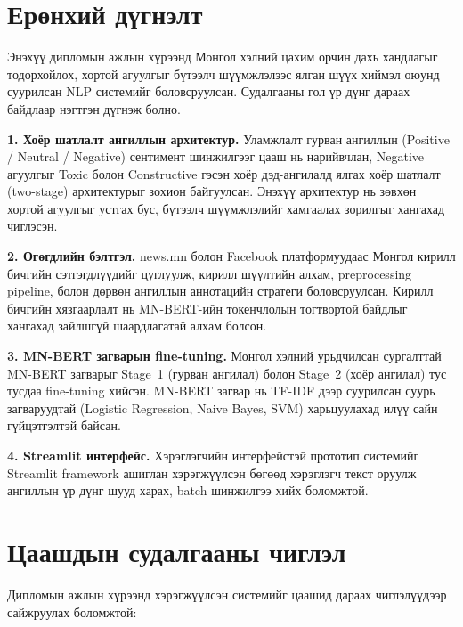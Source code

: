 
{}
\label{Summary}

\section*{Ерөнхий дүгнэлт}

Энэхүү дипломын ажлын хүрээнд Монгол хэлний цахим орчин дахь хандлагыг
тодорхойлох, хортой агуулгыг бүтээлч шүүмжлэлээс ялган шүүх хиймэл оюунд
суурилсан NLP системийг боловсруулсан. Судалгааны гол үр дүнг дараах байдлаар
нэгтгэн дүгнэж болно.

\textbf{1. Хоёр шатлалт ангиллын архитектур.}
Уламжлалт гурван ангиллын (Positive / Neutral / Negative) сентимент шинжилгээг
цааш нь нарийвчлан, Negative агуулгыг Toxic болон Constructive гэсэн хоёр
дэд-ангилалд ялгах хоёр шатлалт (two-stage) архитектурыг зохион байгуулсан.
Энэхүү архитектур нь зөвхөн хортой агуулгыг устгах бус, бүтээлч шүүмжлэлийг
хамгаалах зорилгыг хангахад чиглэсэн.

\textbf{2. Өгөгдлийн бэлтгэл.}
news.mn болон Facebook платформуудаас Монгол кирилл бичгийн сэтгэгдлүүдийг
цуглуулж, кирилл шүүлтийн алхам, preprocessing pipeline, болон дөрвөн ангиллын
аннотацийн стратеги боловсруулсан. Кирилл бичгийн хязгаарлалт нь MN-BERT-ийн
токенчлолын тогтвортой байдлыг хангахад зайлшгүй шаардлагатай алхам болсон.

\textbf{3. MN-BERT загварын fine-tuning.}
Монгол хэлний урьдчилсан сургалттай MN-BERT загварыг Stage~1 (гурван ангилал)
болон Stage~2 (хоёр ангилал) тус тусдаа fine-tuning хийсэн. MN-BERT загвар нь
TF-IDF дээр суурилсан суурь загваруудтай (Logistic Regression, Naive Bayes,
SVM) харьцуулахад илүү сайн гүйцэтгэлтэй байсан.

\textbf{4. Streamlit интерфейс.}
Хэрэглэгчийн интерфейстэй прототип системийг Streamlit framework ашиглан
хэрэгжүүлсэн бөгөөд хэрэглэгч текст оруулж ангиллын үр дүнг шууд харах,
batch шинжилгээ хийх боломжтой.

\section*{Цаашдын судалгааны чиглэл}

Дипломын ажлын хүрээнд хэрэгжүүлсэн системийг цаашид дараах чиглэлүүдээр
сайжруулах боломжтой:

